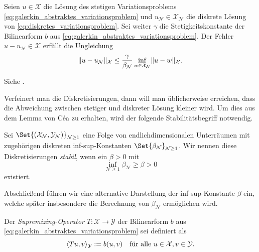 \documentclass[../main.tex]{subfiles}
\begin{document}
\begin{Satz}\label{satz:lemma_von_cea}
    Seien $u \in \mathcal X$ die Lösung des stetigen Variationsproblems \cref{eq:galerkin_abstraktes_variationsproblem} und $u_{\mathcal N} \in \mathcal X_{\mathcal N}$ die diskrete Lösung von \cref{eq:diskretes_variationsproblem}.
    Sei weiter $\gamma$ die Stetigkeitskonstante der Bilinearform $b$ aus \cref{eq:galerkin_abstraktes_variationsproblem}.
    Der Fehler $u - u_{\mathcal N} \in \mathcal X$ erfüllt die Ungleichung
    \begin{equation}\label{eq:lemma_von_cea}
        \norm{u - u_{\mathcal N}}_{\mathcal X} \leq \frac{\gamma}{\beta_{\mathcal N}} \inf_{w \in \mathcal X_{\mathcal N}} \norm{u - w}_{\mathcal X}.
    \end{equation}

    \begin{Beweis}
        Siehe \cite[Theorem 3.2]{Nochetto:2009il}.
    \end{Beweis}
\end{Satz}

Verfeinert man die Diskretisierungen, dann will man üblicherweise erreichen, dass die Abweichung zwischen stetiger und diskreter Lösung kleiner wird.
Um dies aus dem Lemma von Céa zu erhalten, wird der folgende Stabilitätsbegriff notwendig.

\begin{Definition}\label{definition:stabile_diskretisierung}
    Sei $\Set{(\mathcal X_{\mathcal N}, \mathcal Y_{\mathcal N})}_{\mathcal N \geq 1}$ eine Folge von endlichdimensionalen Unterräumen mit zugehörigen diskreten inf-sup-Konstanten $\Set{\beta_{\mathcal N}}_{\mathcal N \geq 1}$.
    Wir nennen diese Diskretisierungen \emph{stabil}, wenn ein $\beta > 0$ mit
    \begin{equation}
        \inf_{\mathcal N \geq 1} \beta_{\mathcal N} \geq \beta > 0
    \end{equation}
    existiert.
\end{Definition}

Abschließend führen wir eine alternative Darstellung der inf-sup-Konstante $\beta$ ein, welche später insbesondere die Berechnung von $\beta_{\mathcal N}$ ermöglichen wird.

\begin{Definition}\label{definition:supremizing_operator}
    Der \emph{Supremizing-Operator} $T \colon \mathcal X \to \mathcal Y$ der Bilinearform $b$ aus \cref{eq:galerkin_abstraktes_variationsproblem} sei definiert als
    \begin{equation}
        \skp{Tu}{v}{\mathcal Y} := b(u, v) \quad \fa u \in \mathcal X, v \in \mathcal Y.
    \end{equation}
\end{Definition}
\end{document}
